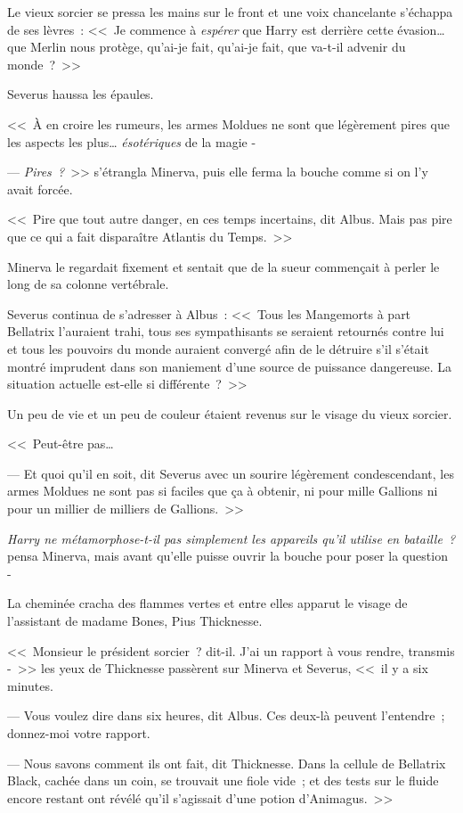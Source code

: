 Le vieux sorcier se pressa les mains sur le front et une voix chancelante s'échappa de ses lèvres~: <<~Je commence à \emph{espérer} que Harry est derrière cette évasion… que Merlin nous protège, qu'ai-je fait, qu'ai-je fait, que va-t-il advenir du monde~?~>>

Severus haussa les épaules.

<<~À en croire les rumeurs, les armes Moldues ne sont que légèrement pires que les aspects les plus… \emph{ésotériques} de la magie -

--- \emph{Pires~?}~>> s'étrangla Minerva, puis elle ferma la bouche comme si on l'y avait forcée.

<<~Pire que tout autre danger, en ces temps incertains, dit Albus. Mais pas pire que ce qui a fait disparaître Atlantis du Temps.~>>

Minerva le regardait fixement et sentait que de la sueur commençait à perler le long de sa colonne vertébrale.

Severus continua de s'adresser à Albus~: <<~Tous les Mangemorts à part Bellatrix l'auraient trahi, tous ses sympathisants se seraient retournés contre lui et tous les pouvoirs du monde auraient convergé afin de le détruire s'il s'était montré imprudent dans son maniement d'une source de puissance dangereuse. La situation actuelle est-elle si différente~?~>>

Un peu de vie et un peu de couleur étaient revenus sur le visage du vieux sorcier.

<<~Peut-être pas…

--- Et quoi qu'il en soit, dit Severus avec un sourire légèrement condescendant, les armes Moldues ne sont pas si faciles que ça à obtenir, ni pour mille Gallions ni pour un millier de milliers de Gallions.~>>

\emph{Harry ne métamorphose-t-il pas simplement les appareils qu'il utilise en bataille~?} pensa Minerva, mais avant qu'elle puisse ouvrir la bouche pour poser la question -

La cheminée cracha des flammes vertes et entre elles apparut le visage de l'assistant de madame Bones, Pius Thicknesse.

<<~Monsieur le président sorcier~? dit-il. J'ai un rapport à vous rendre, transmis -~>> les yeux de Thicknesse passèrent sur Minerva et Severus, <<~il y a six minutes.

--- Vous voulez dire dans six heures, dit Albus. Ces deux-là peuvent l'entendre~; donnez-moi votre rapport.

--- Nous savons comment ils ont fait, dit Thicknesse. Dans la cellule de Bellatrix Black, cachée dans un coin, se trouvait une fiole vide~; et des tests sur le fluide encore restant ont révélé qu'il s'agissait d'une potion d'Animagus.~>>

